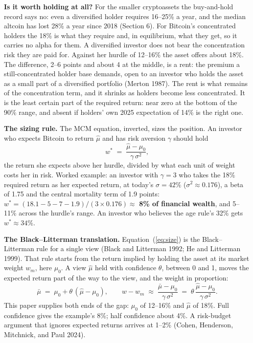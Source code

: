 \documentclass[11pt]{article}
\begin{document}
\textbf{Is it worth holding at all?} For the smaller cryptoassets the buy-and-hold record says no: even a diversified holder requires 16--25\% a year, and the median altcoin has lost 28\% a year since 2018 (Section 6). For Bitcoin's concentrated holders the 18\% is what they require and, in equilibrium, what they get, so it carries no alpha for them. A diversified investor does not bear the concentration risk they are paid for. Against her hurdle of 12--16\% the asset offers about 18\%. The difference, 2--6 points and about 4 at the middle, is a rent: the premium a still-concentrated holder base demands, open to an investor who holds the asset as a small part of a diversified portfolio (Merton 1987). The rent is what remains of the concentration term, and it shrinks as holders become less concentrated. It is the least certain part of the required return: near zero at the bottom of the 90\% range, and absent if holders' own 2025 expectation of 14\% is the right one.

\textbf{The sizing rule.} The MCM equation, inverted, sizes the position. An investor who expects Bitcoin to return $\hat{\mu}$ and has risk aversion $\gamma$ should hold
\begin{equation}
w^{*} \;=\; \frac{\hat{\mu} - \mu_0}{\gamma\,\sigma^{2}},
\label{eq:size}
\end{equation}
the return she expects above her hurdle, divided by what each unit of weight costs her in risk. Worked example: an investor with $\gamma = 3$ who takes the 18\% required return as her expected return, at today's $\sigma = 42\%$ ($\sigma^2 \approx 0.176$), a beta of 1.75 and the central mortality term of 1.9 points: $w^{*} = (18.1 - 5 - 7 - 1.9)/(3 \times 0.176) \approx$ \textbf{8\% of financial wealth}, and 5--11\% across the hurdle's range. An investor who believes the age rule's 32\% gets $w^{*} \approx 34\%$.

\textbf{The Black--Litterman translation.} Equation~(\ref{eq:size}) is the Black--Litterman rule for a single view (Black and Litterman 1992; He and Litterman 1999). That rule starts from the return implied by holding the asset at its market weight $w_m$, here $\mu_0$. A view $\hat{\mu}$ held with confidence $\theta$, between 0 and 1, moves the expected return part of the way to the view, and the weight in proportion:
\begin{equation}
\bar{\mu} \;=\; \mu_0 + \theta\,(\hat{\mu} - \mu_0), \qquad w - w_m \;\approx\; \frac{\bar{\mu} - \mu_0}{\gamma\,\sigma^{2}} \;=\; \theta\,\frac{\hat{\mu} - \mu_0}{\gamma\,\sigma^{2}}.
\label{eq:bl}
\end{equation}
This paper supplies both ends of the gap: $\mu_0$ of 12--16\% and $\hat{\mu}$ of 18\%. Full confidence gives the example's 8\%; half confidence about 4\%. A risk-budget argument that ignores expected returns arrives at 1--2\% (Cohen, Henderson, Mitchnick, and Paul 2024).
\end{document}

